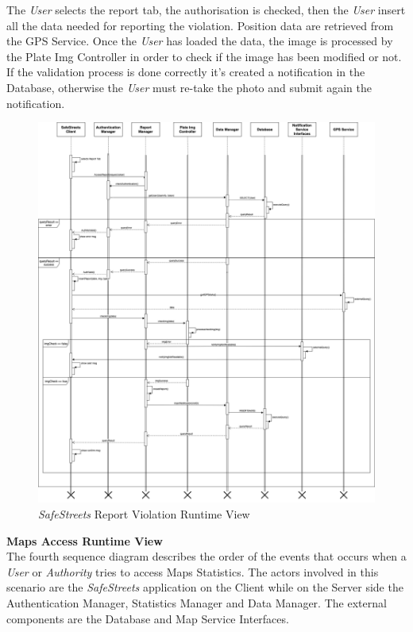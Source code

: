 \documentclass{article}
\begin{document}
	The {\it User} selects the report tab, the authorisation is checked, then the {\it User} insert all the data needed for reporting the violation. Position data are retrieved from the GPS Service. Once the {\it User} has loaded the data, the image is processed by the Plate Img Controller in order to check if the image has been modified or not. If the validation process is done correctly it's created a notification in the Database, otherwise the {\it User} must re-take the photo and submit again the notification.
	\begin{figure}[H]
			\centering
			\includegraphics[scale=0.22]{Images/Diagrams/Runtime/report_runtime.png}
			\caption{{\it SafeStreets} Report Violation Runtime View}
	\end{figure}
	\pagebreak
	\noindent
	{\bf Maps Access Runtime View} \\
	The fourth sequence diagram describes the order of the events that occurs when a {\it User} or {\it Authority} tries to access Maps Statistics. The actors involved in this scenario are the {\it SafeStreets} application on the Client while on the Server side the Authentication Manager, Statistics Manager and Data Manager. The external components are the Database and Map Service Interfaces. \\ 
\end{document}
